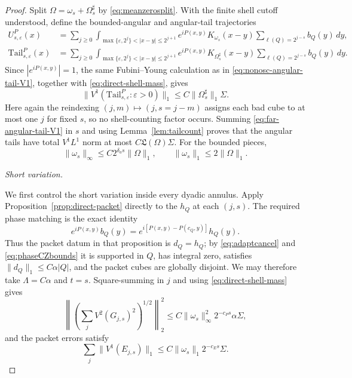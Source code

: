 \documentclass[11pt]{article}
\numberwithin{equation}{section}
\theoremstyle{remark}
\theoremstyle{definition}
\newcommand{\norm}[1]{\lVert #1\rVert}
\begin{document}
\begin{proof}
Split $\Omega=\omega_s+\Omega_s^\sharp$ by
\eqref{eq:meanzerosplit}.  With the finite shell cutoff understood, define
the bounded-angular and angular-tail trajectories
\begin{align}
 U^P_{s,\varepsilon}(x)
 &=\sum_{j\ge0}
 \int_{\max\{\varepsilon,2^j\}<|x-y|\le2^{j+1}}
 e^{iP(x,y)}K_{\omega_s}(x-y)
 \sum_{\ell(Q)=2^{j-s}}b_Q(y)\,dy,
 \label{eq:far-bounded-trajectory}\\
 \mathrm{Tail}^{P}_{s,\varepsilon}(x)
 &=\sum_{j\ge0}
 \int_{\max\{\varepsilon,2^j\}<|x-y|\le2^{j+1}}
 e^{iP(x,y)}K_{\Omega_s^\sharp}(x-y)
 \sum_{\ell(Q)=2^{j-s}}b_Q(y)\,dy.
 \label{eq:far-angular-tail}
\end{align}
Since $|e^{iP(x,y)}|=1$, the same Fubini--Young calculation as in
\eqref{eq:nonosc-angular-tail-V1}, together with
\eqref{eq:direct-shell-mass}, gives
\begin{equation}\label{eq:far-angular-tail-V1}
 \norm{V^1(\mathrm{Tail}^{P}_{s,\varepsilon}:\varepsilon>0)}_1
 \le C\norm{\Omega_s^\sharp}_1\Sigma.
\end{equation}
Here again the reindexing $(j,m)\mapsto(j,s=j-m)$ assigns each bad cube to
at most one $j$ for fixed $s$, so no shell-counting factor occurs.  Summing
\eqref{eq:far-angular-tail-V1} in $s$ and using
Lemma~\ref{lem:tailcount} proves that the angular tails have total
$V^1L^1$ norm at most $C\mathfrak L(\Omega)\Sigma$.  For the bounded pieces,
\begin{equation}\label{eq:far-angular-bounded}
 \norm{\omega_s}_\infty\le C2^{\delta_as}\norm\Omega_1,
 \qquad \norm{\omega_s}_1\le2\norm\Omega_1.
\end{equation}

\smallskip
\noindent\emph{Short variation.}

We first control the short variation inside every dyadic annulus.  Apply
Proposition~\ref{prop:direct-packet} directly to the $h_Q$ at each
$(j,s)$.  The required phase matching is the exact identity
\begin{equation}\label{eq:far-direct-phase-matching}
 e^{iP(x,y)}b_Q(y)
 =e^{i[P(x,y)-P(c_Q,y)]}h_Q(y).
\end{equation}
Thus the packet datum in that proposition is $d_Q=h_Q$; by
\eqref{eq:adaptcancel} and \eqref{eq:phaseCZbounds} it is supported in
$Q$, has integral zero, satisfies
$\|d_Q\|_1\le C\alpha|Q|$, and the packet cubes are globally disjoint.
We may therefore take $\Lambda=C\alpha$ and $t=s$.  Square-summing in
$j$ and using \eqref{eq:direct-shell-mass} gives
\begin{equation}\label{eq:far-short-direct}
 \left\|\left(\sum_jV^2(G_{j,s})^2\right)^{1/2}\right\|_2^2
 \le C\norm{\omega_s}_\infty^2 2^{-c_Ps}\alpha\Sigma,
\end{equation}
and the packet errors satisfy
\begin{equation}\label{eq:far-short-error}
 \sum_j\norm{V^1(E_{j,s})}_1
 \le C\norm{\omega_s}_1 2^{-c_Es}\Sigma.
\end{equation}


\end{proof}
\end{document}
